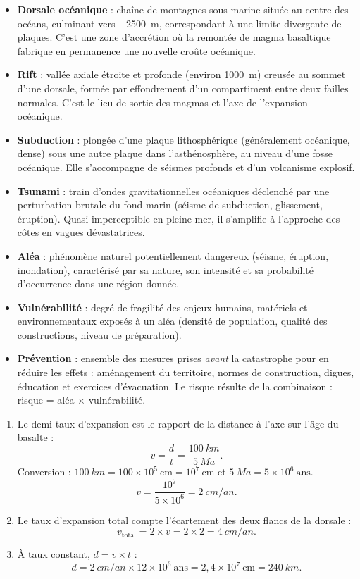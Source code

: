 \documentclass[11pt]{article}
\begin{document}
\begin{corrige}
\begin{itemize}
\item \textbf{Dorsale océanique} : chaîne de montagnes sous-marine située au centre des océans, culminant vers \SI{-2500}{m}, correspondant à une limite divergente de plaques. C'est une zone d'accrétion où la remontée de magma basaltique fabrique en permanence une nouvelle croûte océanique.
\item \textbf{Rift} : vallée axiale étroite et profonde (environ \SI{1000}{m}) creusée au sommet d'une dorsale, formée par effondrement d'un compartiment entre deux failles normales. C'est le lieu de sortie des magmas et l'axe de l'expansion océanique.
\item \textbf{Subduction} : plongée d'une plaque lithosphérique (généralement océanique, dense) sous une autre plaque dans l'asthénosphère, au niveau d'une fosse océanique. Elle s'accompagne de séismes profonds et d'un volcanisme explosif.
\item \textbf{Tsunami} : train d'ondes gravitationnelles océaniques déclenché par une perturbation brutale du fond marin (séisme de subduction, glissement, éruption). Quasi imperceptible en pleine mer, il s'amplifie à l'approche des côtes en vagues dévastatrices.
\item \textbf{Aléa} : phénomène naturel potentiellement dangereux (séisme, éruption, inondation), caractérisé par sa nature, son intensité et sa probabilité d'occurrence dans une région donnée.
\item \textbf{Vulnérabilité} : degré de fragilité des enjeux humains, matériels et environnementaux exposés à un aléa (densité de population, qualité des constructions, niveau de préparation).
\item \textbf{Prévention} : ensemble des mesures prises \emph{avant} la catastrophe pour en réduire les effets : aménagement du territoire, normes de construction, digues, éducation et exercices d'évacuation. Le risque résulte de la combinaison : risque = aléa $\times$ vulnérabilité.
\end{itemize}
\end{corrige}

\begin{corrige}
\begin{enumerate}
\item Le demi-taux d'expansion est le rapport de la distance à l'axe sur l'âge du basalte :
\[ v = \frac{d}{t} = \frac{\SI{100}{km}}{\SI{5}{Ma}}. \]
Conversion : $\SI{100}{km} = 100 \times 10^{5}\ \text{cm} = 10^{7}\ \text{cm}$ et $\SI{5}{Ma} = 5 \times 10^{6}\ \text{ans}$.
\[ v = \frac{10^{7}}{5 \times 10^{6}} = \SI{2}{cm/an}. \]
\item Le taux d'expansion total compte l'écartement des deux flancs de la dorsale :
\[ v_{\text{total}} = 2 \times v = 2 \times 2 = \SI{4}{cm/an}. \]
\item À taux constant, $d = v \times t$ :
\[ d = \SI{2}{cm/an} \times 12 \times 10^{6}\ \text{ans} = 2{,}4 \times 10^{7}\ \text{cm} = \SI{240}{km}. \]
\end{enumerate}
\end{corrige}
\end{document}
